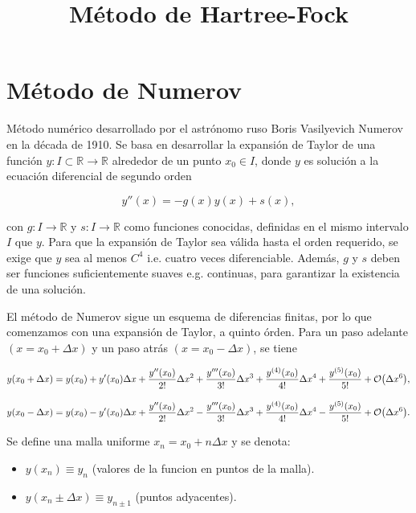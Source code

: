 \documentclass[11pt]{article}
\date{}
\title{Método de Hartree-Fock}
\begin{document}
\maketitle

\section{Método de Numerov}
\label{sec:org58b07f0}

Método numérico desarrollado por el astrónomo ruso Boris Vasilyevich Numerov en la década de 1910. Se basa en desarrollar la expansión de Taylor de una función \(y : I \subset \mathbb{R} \to \mathbb{R}\) alrededor de un punto \(x_0 \in I\), donde \(y\) es solución a la ecuación diferencial de segundo orden

\begin{equation}
\label{eq:numerov-eq}
    y''(x) = - g(x)y(x) + s(x),
\end{equation}

con \(g: I \to \mathbb{R}\) y \(s: I \to \mathbb{R}\) como funciones conocidas, definidas en el mismo intervalo \(I\) que \(y\). Para que la expansión de Taylor sea válida hasta el orden requerido, se exige que \(y\) sea al menos \(C^4\) i.e. cuatro veces diferenciable. Además, \(g\) y \(s\) deben ser funciones suficientemente suaves e.g. continuas, para garantizar la existencia de una solución.

El método de Numerov sigue un esquema de diferencias finitas, por lo que comenzamos con una expansión de Taylor, a quinto órden. Para un paso adelante \((x= x_{0} + \Delta x)\) y un paso atrás \((x=x_{0} - \Delta x)\), se tiene

\[ y(x_{0} + \Delta x ) = y(x_{0}) + y'(x_{0})\Delta x + \frac{y''(x_{0})}{2!} \Delta x^2 + \frac{y'''(x_{0})}{3!}\Delta x^3 + \frac{y^{(4)}(x_{0})}{4!}\Delta x^4 + \frac{y^{(5)}(x_0)}{5!} + \order{\Delta x^6}, \]

\[ y(x_{0} - \Delta x ) = y(x_{0}) - y'(x_{0})\Delta x + \frac{y''(x_{0})}{2!} \Delta x^2 - \frac{y'''(x_{0})}{3!}\Delta x^3 + \frac{y^{(4)}(x_{0})}{4!}\Delta x^4 - \frac{y^{(5)}(x_0)}{5!} + \order{\Delta x^6}. \]

Se define una malla uniforme \(x_n = x_0 + n\Delta x\) y se denota:

\begin{itemize}
\item \(y(x_n) \equiv y_n\) (valores de la funcion en puntos de la malla).
\item \(y(x_n \pm \Delta x) \equiv y_{n \pm 1}\) (puntos adyacentes).
\end{itemize}
\end{document}
